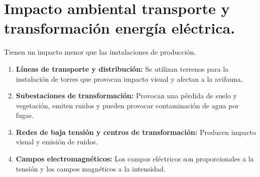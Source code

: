 \section{Impacto ambiental transporte y transformación energía eléctrica.}
Tienen un impacto menor que las instalaciones de producción.
\begin{enumerate}
	\item \textbf{Líneas de transporte y distribución:} Se utilizan terrenos para la instalación de torres que provocan impacto visual y afectan a la avifauna.
	\item \textbf{Subestaciones de transformación:}
	Provocan una pérdida de suelo y vegetación, emiten ruidos y pueden provocar contaminación de agua por fugas.
	\item \textbf{Redes de baja tensión y centros de transformación:} Producen impacto visual y emisión de ruidos.
	\item \textbf{Campos electromagnéticos:} Los campos eléctricos son proporcionales a la tensión y los campos magnéticos a la intensidad.	
\end{enumerate}
